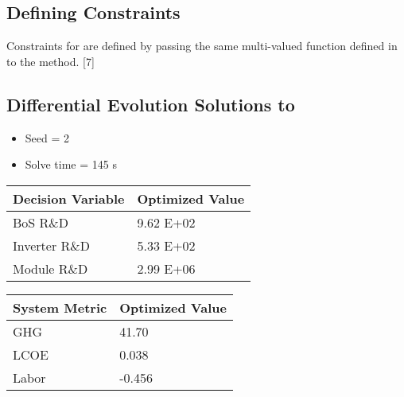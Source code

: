 \documentclass[letterpaper,10pt,english]{sphinxmanual}
\begin{document}
\subsection{Defining Constraints}
\label{\detokenize{optimizers:defining-constraints-2}}\label{\detokenize{optimizers:defining-constraints-1}}
Constraints for  are defined by passing the
same multi-valued function defined in  to the
 method. {[}7{]}


\subsection{Differential Evolution Solutions to }
\label{\detokenize{optimizers:differential-evolution-solutions-to-pv-residential-simple}}
\begin{itemize}
\item {} 
Seed = 2

\item {} 
Solve time = 145 s

\end{itemize}


\begin{savenotes}\sphinxattablestart
\centering
\begin{tabulary}{\linewidth}[t]{|T|T|}
\hline
\sphinxstyletheadfamily 
Decision Variable
&\sphinxstyletheadfamily 
Optimized Value
\\
\hline
BoS R\&D
&
9.62 E+02
\\
\hline
Inverter R\&D
&
5.33 E+02
\\
\hline
Module R\&D
&
2.99 E+06
\\
\hline
\end{tabulary}
\par
\sphinxattableend\end{savenotes}


\begin{savenotes}\sphinxattablestart
\centering
\begin{tabulary}{\linewidth}[t]{|T|T|}
\hline
\sphinxstyletheadfamily 
System Metric
&\sphinxstyletheadfamily 
Optimized Value
\\
\hline
GHG
&
41.70
\\
\hline
LCOE
&
0.038
\\
\hline
Labor
&
-0.456
\\
\hline
\end{tabulary}
\par
\sphinxattableend\end{savenotes}
\end{document}
